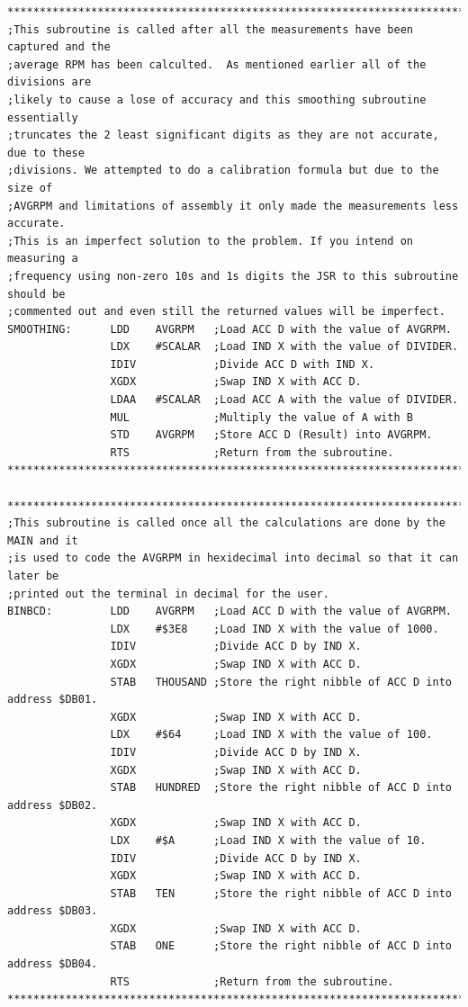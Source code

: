 \documentclass[12pt]{report}
\begin{document}
\begin{Verbatim}[frame=single, fontsize=\footnotesize]
****************************************************************************************
;This subroutine is called after all the measurements have been captured and the
;average RPM has been calculted.  As mentioned earlier all of the divisions are
;likely to cause a lose of accuracy and this smoothing subroutine essentially
;truncates the 2 least significant digits as they are not accurate, due to these
;divisions. We attempted to do a calibration formula but due to the size of
;AVGRPM and limitations of assembly it only made the measurements less accurate.
;This is an imperfect solution to the problem. If you intend on measuring a
;frequency using non-zero 10s and 1s digits the JSR to this subroutine should be
;commented out and even still the returned values will be imperfect.
SMOOTHING:      LDD    AVGRPM   ;Load ACC D with the value of AVGRPM.
                LDX    #SCALAR  ;Load IND X with the value of DIVIDER.
                IDIV            ;Divide ACC D with IND X.
                XGDX            ;Swap IND X with ACC D.
                LDAA   #SCALAR  ;Load ACC A with the value of DIVIDER.
                MUL             ;Multiply the value of A with B
                STD    AVGRPM   ;Store ACC D (Result) into AVGRPM.
                RTS             ;Return from the subroutine.
****************************************************************************************

****************************************************************************************
;This subroutine is called once all the calculations are done by the MAIN and it
;is used to code the AVGRPM in hexidecimal into decimal so that it can later be
;printed out the terminal in decimal for the user.
BINBCD:         LDD    AVGRPM   ;Load ACC D with the value of AVGRPM.
                LDX    #$3E8    ;Load IND X with the value of 1000.
                IDIV            ;Divide ACC D by IND X.
                XGDX            ;Swap IND X with ACC D.
                STAB   THOUSAND ;Store the right nibble of ACC D into address $DB01.
                XGDX            ;Swap IND X with ACC D.
                LDX    #$64     ;Load IND X with the value of 100.
                IDIV            ;Divide ACC D by IND X.
                XGDX            ;Swap IND X with ACC D.
                STAB   HUNDRED  ;Store the right nibble of ACC D into address $DB02.
                XGDX            ;Swap IND X with ACC D.
                LDX    #$A      ;Load IND X with the value of 10.
                IDIV            ;Divide ACC D by IND X.
                XGDX            ;Swap IND X with ACC D.
                STAB   TEN      ;Store the right nibble of ACC D into address $DB03.
                XGDX            ;Swap IND X with ACC D.
                STAB   ONE      ;Store the right nibble of ACC D into address $DB04.
                RTS             ;Return from the subroutine.
****************************************************************************************


\end{Verbatim}
\end{document}
